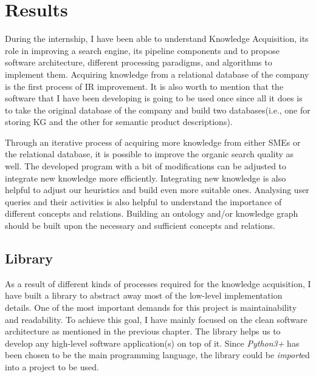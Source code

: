 \label{chap:results_discussions}
\section{Results}

During the internship, I have been able to understand Knowledge Acquisition, its role in improving 
a search engine, its pipeline components and to propose software architecture, different processing 
paradigms, and algorithms to implement them. Acquiring knowledge from a relational database of the 
company is the first process of IR improvement. It is also worth to mention that the software 
that I have been developing is going to be used once since all it does is to take the original 
database of the company and build two databases(i.e., one for storing KG and the other for semantic 
product descriptions).

Through an iterative process of acquiring more knowledge from either SMEs or the relational database, 
it is possible to improve the organic search quality as well. The developed program with a bit of 
modifications can be adjusted to integrate new knowledge more efficiently. Integrating new knowledge 
is also helpful to adjust our heuristics and build even more suitable ones. Analysing user queries and 
their activities is also helpful to understand the importance of different concepts and relations. 
Building an ontology and/or knowledge graph should be built upon the necessary and sufficient concepts 
and relations.

\subsection{Library}

As a result of different kinds of processes required for the knowledge acquisition, I have 
built a library to abstract away most of the low-level implementation details. One of the most 
important demands for this project is maintainability and readability. To achieve this goal, 
I have mainly focused on the clean software architecture as mentioned in the previous chapter. 
The library helps us to develop any high-level software application(s) on top of it. Since 
\textit{Python3+} has been chosen to be the main programming language, the library could be 
\textit{import}ed into a project to be used.

